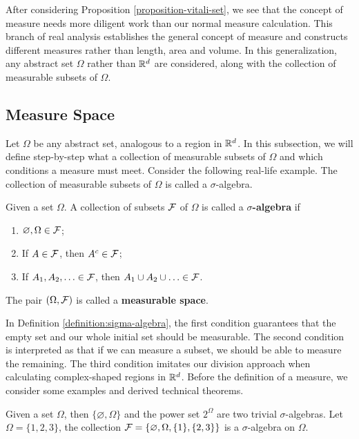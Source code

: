 After considering Proposition \ref{proposition-vitali-set}, we see that the concept of measure needs more diligent work than our normal measure calculation. This branch of real analysis establishes the general concept of measure and constructs different measures rather than length, area and volume. In this generalization, any abstract set $\Omega$ rather than $\mathbb{R}^d$ are considered, along with the collection of measurable subsets of $\Omega$.

\subsection{Measure Space}

Let $\Omega$ be any abstract set, analogous to a region in $\mathbb{R}^d$. In this subsection, we will define step-by-step what a collection of measurable subsets of $\Omega$ and which conditions a measure must meet. Consider the following real-life example. The collection of measurable subsets of $\Omega$ is called a $\sigma$-algebra.

\begin{definition}
  \label{definition:sigma-algebra}
  Given a set $\Omega$. A collection of subsets $\mathcal{F}$ of $\Omega$ is called a \textbf{$\sigma$-algebra} if
  \begin{enumerate}
    \item $\varnothing, \Omega\in\mathcal{F}$;
    \item If $A\in\mathcal{F}$, then $A^c\in\mathcal{F}$;
    \item If $A_1,A_2,\ldots\in\mathcal{F}$, then $A_1\cup A_2\cup\ldots\in\mathcal{F}$.
  \end{enumerate}
  The pair $(\Omega, \mathcal{F})$ is called a \textbf{measurable space}.
\end{definition}

In Definition \ref{definition:sigma-algebra}, the first condition guarantees that the empty set and our whole initial set should be measurable. The second condition is interpreted as that if we can measure a subset, we should be able to measure the remaining. The third condition imitates our division approach when calculating complex-shaped regions in $\mathbb{R}^d$. Before the definition of a measure, we consider some examples and derived technical theorems.

\begin{example}
  \label{example:1}
  Given a set $\Omega$, then $\{\varnothing, \Omega\}$ and the power set $2^\Omega$ are two trivial $\sigma$-algebras. Let $\Omega=\{1,2,3\}$, the collection $\mathcal{F}=\{\varnothing,\Omega, \{1\}, \{2,3\}\}$ is a $\sigma$-algebra on $\Omega$.
\end{example}

